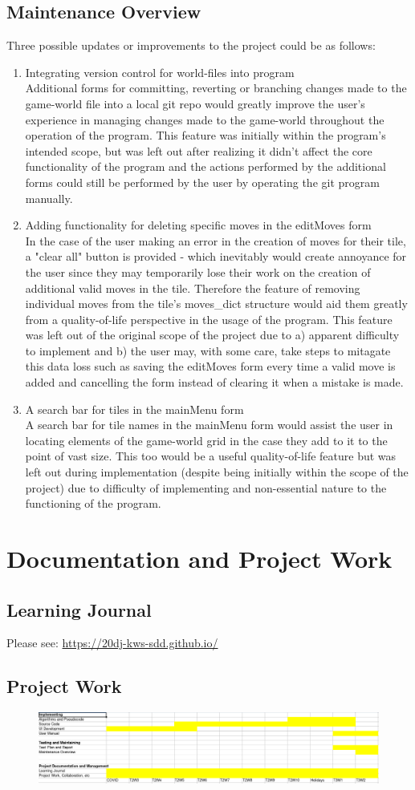 \documentclass{article} \usepackage[margin=1in,headheight=57pt,headsep=0.1in]{geometry}
\begin{document}
\subsection{Maintenance Overview}
Three possible updates or improvements to the project could be as follows:
\begin{enumerate}
	\item Integrating version control for world-files into program \\
		Additional forms for committing, reverting or branching changes made to the game-world file into a local git repo would greatly improve the user's experience in managing changes made to the game-world throughout the operation of the program. This feature was initially within the program's intended scope, but was left out after realizing it didn't affect the core functionality of the program and the actions performed by the additional forms could still be performed by the user by operating the git program manually.
	\item Adding functionality for deleting specific moves in the editMoves form \\
		In the case of the user making an error in the creation of moves for their tile, a "clear all" button is provided - which inevitably would create annoyance for the user since they may temporarily lose their work on the creation of additional valid moves in the tile. Therefore the feature of removing individual moves from the tile's moves\_dict structure would aid them greatly from a quality-of-life perspective in the usage of the program. This feature was left out of the original scope of the project due to a) apparent difficulty to implement and b) the user may, with some care, take steps to mitagate this data loss such as saving the editMoves form every time a valid move is added and cancelling the form instead of clearing it when a mistake is made.
	\item A search bar for tiles in the mainMenu form \\
		A search bar for tile names in the mainMenu form would assist the user in locating elements of the game-world grid in the case they add to it to the point of vast size. This too would be a useful quality-of-life feature but was left out during implementation (despite being initially within the scope of the project) due to difficulty of implementing and non-essential nature to the functioning of the program.
\end{enumerate}
\section{Documentation and Project Work}
\subsection{Learning Journal}
Please see: \url{https://20dj-kws-sdd.github.io/}
\subsection{Project Work}
\begin{figure}[H]
	\centering
	\includegraphics[width=1.0\textwidth]{Images/gantt.png}
\end{figure}
\end{document}
